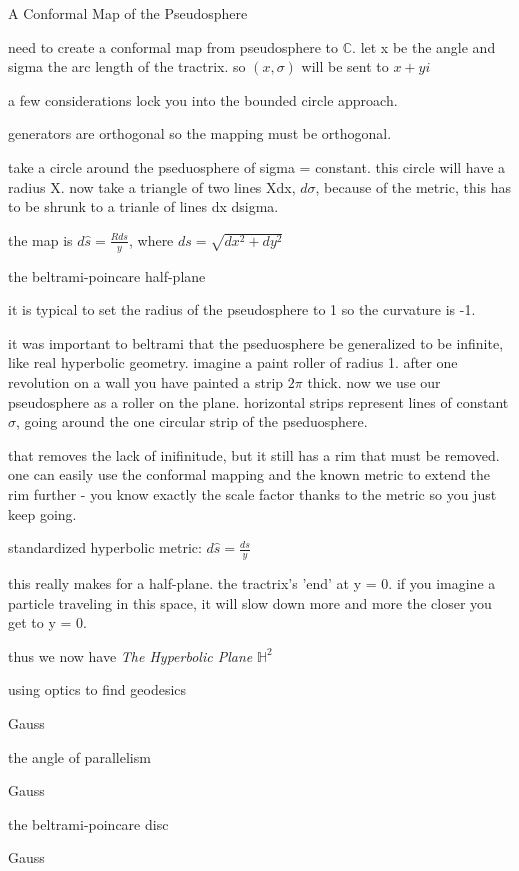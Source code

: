 \documentclass{article}
\newenvironment{andrew_section}[1]
    {
    \section{#1}
    \begin{itemize}
    }
    {
    \end{itemize}
    }
\begin{document}
\begin{andrew_section}{A Conformal Map of the Pseudosphere}
    \item 
        need to create a conformal map from pseudosphere to $\mathbb{C}$.
        let x be the angle and sigma the arc length of the tractrix.
        so $(x,\sigma)$ will be sent to $x + yi$
    \item 
        a few considerations lock you into the bounded circle approach.
    \item 
        generators are orthogonal so the mapping must be orthogonal.
    \item 
        take a circle around the pseduosphere of sigma = constant.  this
        circle will have a radius X.  now take a triangle of two lines Xdx,
        $d\sigma$, because of the metric, this has to be shrunk to a trianle of
        lines dx dsigma.
    \item 
        the map is $d\hat{s} = \frac{R ds}{y}$, where $ds = \sqrt{dx^2 + dy^2}$
\end{andrew_section}

\begin{andrew_section}{the beltrami-poincare half-plane}
    \item 
        it is typical to set the radius of the pseudosphere
        to 1 so the curvature is -1.
    \item 
        it was important to beltrami that the pseduosphere be generalized
        to be infinite, like real hyperbolic geometry.  imagine a paint roller
        of radius 1.  after one revolution on a wall you have painted a strip
        $2\pi$ thick.  now we use our pseudosphere as a roller on the plane.
        horizontal strips represent lines of constant$\sigma$, going around
        the one circular strip of the pseduosphere.
    \item 
        that removes the lack of inifinitude, but it still has a rim that
        must be removed.  one can easily use the conformal mapping and the known
        metric to extend the rim further - you know exactly the scale factor
        thanks to the metric so you just keep going.
    \item 
        standardized hyperbolic metric: $d\hat{s} = \frac{ds}{y}$
    \item 
        this really makes for a half-plane.  the tractrix's 'end' at 
        y = 0.  if you imagine a particle traveling in this space,
        it will slow down more and more the closer you get to
        y = 0.
    \item 
        thus we now have \emph{The Hyperbolic Plane} $\mathbb{H}^2$
\end{andrew_section}

\begin{andrew_section}{using optics to find geodesics}
    \item 
        Gauss
\end{andrew_section}

\begin{andrew_section}{the angle of parallelism}
    \item 
        Gauss
\end{andrew_section}

\begin{andrew_section}{the beltrami-poincare disc}
    \item 
        Gauss
\end{andrew_section}
\end{document}
